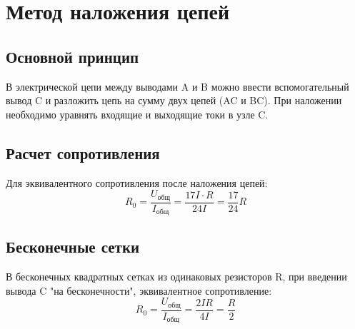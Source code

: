 \documentclass[12pt]{article}
\begin{document}
\section*{Метод наложения цепей}

\subsection*{Основной принцип}
В электрической цепи между выводами A и B можно ввести вспомогательный вывод C и разложить цепь на сумму двух цепей (AC и BC). При наложении необходимо уравнять входящие и выходящие токи в узле C.

\subsection*{Расчет сопротивления}
Для эквивалентного сопротивления после наложения цепей:
\[
R_0 = \frac{U_\text{общ}}{I_\text{общ}} = \frac{17I\cdot R}{24I} = \frac{17}{24}R
\]

\subsection*{Бесконечные сетки}
В бесконечных квадратных сетках из одинаковых резисторов R, при введении вывода C "на бесконечности", эквивалентное сопротивление:
\[
R_0 = \frac{U_\text{общ}}{I_\text{общ}} = \frac{2IR}{4I} = \frac{R}{2}
\]
\end{document}
